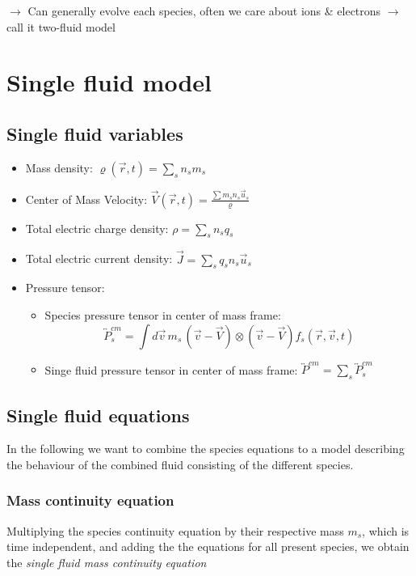 $\to$ Can generally evolve each species, often we care about ions \& electrons $\to$ call it two-fluid model



\section{Single fluid model}
\subsection{Single fluid variables}
\begin{itemize}
    \item Mass density: $\varrho(\vec{r}, t) = \sum_s n_s m_s$
    \item Center of Mass Velocity: $\vec{V}(\vec{r}, t) = \frac{\sum m_s n_s \vec{u}_s}{\varrho}$
    \item Total electric charge density: $\rho = \sum_s n_s q_s$
    \item Total electric current density: $\vec{J} = \sum_s q_s n_s \vec{u}_s$
    \item Pressure tensor:
    \begin{itemize}
        \item Species pressure tensor in center of mass frame: \[\overleftrightarrow{P}_s^{cm} = \int d\vec{v} \,m_s\, (\vec{v}-\vec{V}) \otimes (\vec{v}-\vec{V}) f_s(\vec{r},\vec{v},t) \]
        \item Singe fluid pressure tensor in center of mass frame: $\overleftrightarrow{P}^{cm} = \sum_s \overleftrightarrow{P}_s^{cm}$
    \end{itemize} 
\end{itemize}

\subsection{Single fluid equations}

In the following we want to combine the species equations to a model describing the behaviour of the combined fluid consisting of the different species.

\subsubsection{Mass continuity equation}
Multiplying the species continuity equation by their respective mass $m_s$, which is time independent, and adding the the equations for all present species, we obtain the \emph{single fluid mass continuity equation}

